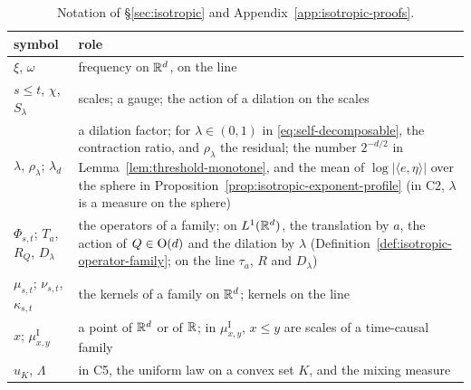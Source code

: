 {\renewcommand{\arraystretch}{0.88}
\begin{longtable}{@{}N{0.2\textwidth}N{0.76\textwidth}@{}}
\toprule
symbol & role \\
\midrule
\endhead
\bottomrule
\endfoot
\bottomrule
\addlinespace
\caption{Notation of \S\ref{sec:isotropic} and Appendix~\ref{app:isotropic-proofs}.}
\label{tab:notation}
\endlastfoot
$\xi$, $\omega$ & frequency on $\mathbb{R}^d$, on the line \\
$s \le t$, $\chi$, $S_\lambda$ & scales; a gauge; the action of a dilation on the scales \\
$\lambda$, $\rho_\lambda$; $\lambda_d$ & a dilation factor; for $\lambda \in (0,1)$ in
  \ref{eq:self-decomposable}, the contraction ratio, and $\rho_\lambda$ the residual; the number
  $2^{-d/2}$ in Lemma~\ref{lem:threshold-monotone}, and the mean of $\log|\langle e,\eta\rangle|$
  over the sphere in Proposition~\ref{prop:isotropic-exponent-profile} (in C2, $\lambda$ is a
  measure on the sphere) \\
$\Phi_{s,t}$; $T_a$, $R_Q$, $D_\lambda$ & the operators of a family; on $L^1(\mathbb{R}^d)$, the
  translation by $a$, the action of $Q \in \mathrm{O}(d)$ and the dilation by $\lambda$
  (Definition~\ref{def:isotropic-operator-family}; on the line $\tau_a$, $R$ and $D_\lambda$) \\
$\mu_{s,t}$; $\nu_{s,t}$, $\kappa_{s,t}$ & the kernels of a family on $\mathbb{R}^d$; kernels on the line \\
$x$; $\mu^{\mathrm I}_{x,y}$ & a point of $\mathbb{R}^d$ or of $\mathbb{R}$; in $\mu^{\mathrm I}_{x,y}$, $x \le y$
  are scales of a time-causal family \\
$u_K$, $\Lambda$ & in C5, the uniform law on a convex set $K$, and the mixing measure \\

\end{longtable}}
